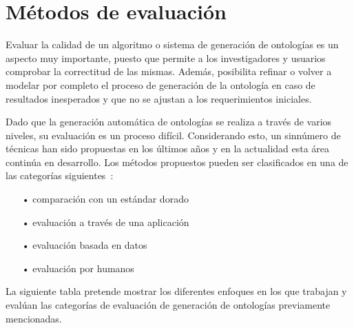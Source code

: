 \section{Métodos de evaluación}\label{section:ontology_evaluation_methods}
Evaluar la calidad de un algoritmo o sistema de generación de ontologías es un aspecto muy importante, puesto que permite a los investigadores y usuarios comprobar la correctitud de las mismas. Además, posibilita refinar o volver a modelar por completo el proceso de generación de la ontología en caso de resultados inesperados y que no se ajustan a los requerimientos iniciales.

Dado que la generación automática de ontologías se realiza a través de varios niveles, su evaluación es un proceso difícil. Considerando esto, un sinnúmero de técnicas han sido propuestas en los últimos años y en la actualidad esta área continúa en desarrollo. Los métodos propuestos pueden ser clasificados en una de las categorías siguientes~\cite{ref:92,ref:34,ref:27}:

\begin{itemize}
	\item[•] comparación con un estándar dorado
	\item[•] evaluación a través de una aplicación
	\item[•] evaluación basada en datos
	\item[•] evaluación por humanos
\end{itemize}

La siguiente tabla pretende mostrar los diferentes enfoques en los que trabajan y evalúan las categorías de evaluación de generación de ontologías previamente mencionadas.


